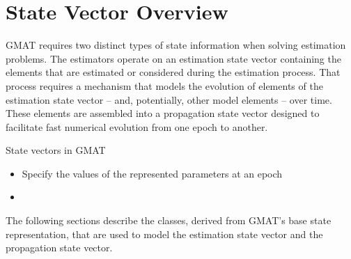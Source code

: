 \section{State Vector Overview}

GMAT requires two distinct types of state information when solving estimation problems.  The
estimators operate on an estimation state vector containing the elements that are estimated or
considered during the estimation process.  That process requires a mechanism that models the
evolution of elements of the estimation state vector -- and, potentially, other model elements --
over time. These elements are assembled into a propagation state vector designed to facilitate fast
numerical evolution from one epoch to another.

State vectors in GMAT

\begin{itemize}
\item Specify the values of the represented parameters at an epoch
\item
\end{itemize}





The following sections describe the classes, derived from GMAT's base state representation, that
are used to model the estimation state vector and the propagation state vector.
